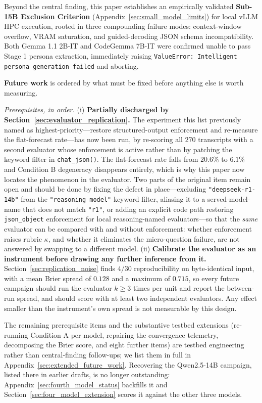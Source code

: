 \documentclass[11pt,journal,onecolumn]{IEEEtran}
\begin{document}
Beyond the central finding, this paper establishes an empirically validated \textbf{Sub-15B Exclusion Criterion} (Appendix~\ref{sec:small_model_limits}) for local vLLM HPC execution, rooted in three compounding failure modes: context-window overflow, VRAM saturation, and guided-decoding JSON schema incompatibility. Both Gemma 1.1 2B-IT and CodeGemma 7B-IT were confirmed unable to pass Stage 1 persona extraction, immediately raising \texttt{ValueError: Intelligent persona generation failed} and aborting.

\textbf{Future work} is ordered by what must be fixed before anything else is worth measuring.

\emph{Prerequisites, in order.} (i) \textbf{Partially discharged by Section~\ref{sec:evaluator_replication}.} The experiment this list previously named as highest-priority---restore structured-output enforcement and re-measure the flat-forecast rate---has now been run, by re-scoring all $270$ transcripts with a second evaluator whose enforcement is active rather than by patching the keyword filter in \texttt{chat\_json()}. The flat-forecast rate falls from $20.6\%$ to $6.1\%$ and Condition B degeneracy disappears entirely, which is why this paper now locates the phenomenon in the evaluator. Two parts of the original item remain open and should be done by fixing the defect in place---excluding \texttt{"deepseek-r1-14b"} from the \texttt{"reasoning model"} keyword filter, aliasing it to a served-model-name that does not match \texttt{"r1"}, or adding an explicit code path restoring \texttt{json\_object} enforcement for local reasoning-named evaluators---so that the \emph{same} evaluator can be compared with and without enforcement: whether enforcement raises rubric $\kappa$, and whether it eliminates the micro-question failure, are not answered by swapping to a different model. (ii) \textbf{Calibrate the evaluator as an instrument before drawing any further inference from it.} Section~\ref{sec:replication_noise} finds $4/30$ reproducibility on byte-identical input, with a mean Brier spread of $0.128$ and a maximum of $0.715$, so every future campaign should run the evaluator $k \geq 3$ times per unit and report the between-run spread, and should score with at least two independent evaluators. Any effect smaller than the instrument's own spread is not measurable by this design.

The remaining prerequisite items and the substantive testbed extensions (re-running Condition A per model, repairing the convergence telemetry, decomposing the Brier score, and eight further items) are testbed engineering rather than central-finding follow-ups; we list them in full in Appendix~\ref{sec:extended_future_work}. Recovering the Qwen2.5-14B campaign, listed there in earlier drafts, is no longer outstanding: Appendix~\ref{sec:fourth_model_status} backfills it and Section~\ref{sec:four_model_extension} scores it against the other three models.
\end{document}
